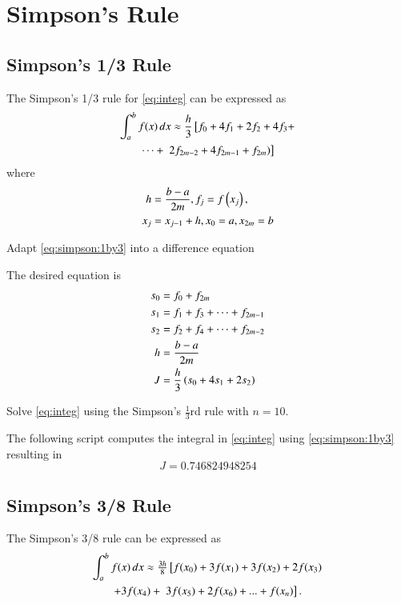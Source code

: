 \documentclass[journal,12pt,twocolumn]{IEEEtran}
\begin{document}
\section{Simpson's Rule}
\subsection{Simpson's 1/3 Rule}
The Simpson's 1/3 rule for \eqref{eq:integ} can be expressed as \cite{kreyszig}
%
\begin{multline}
\label{eq:simpson:1by3}
\int_{a}^{b}f(x)\,dx \approx \frac{h}{3} {}\left[f_0+4f_1+2f_2 + 4f_3 +\right.
\\
\dots + {}\left.2f_{2m-2}+4f_{2m-1}+f_{2m})\right]
\end{multline}
%
where 
%
\begin{align}
h &= \frac{b-a}{2m}, f_j = f\left(x_j\right),
\\
x_j &= x_{j-1} + h, x_0 = a, x_{2m} = b
\end{align}
%

\begin{problem}
Adapt \eqref{eq:simpson:1by3} into a difference equation
\end{problem}
\solution The desired equation is
%
\begin{align}
\label{eq:simpson_1_3_diff}
s_0 &= f_0 + f_{2m}
\\
s_1 &= f_1 + f_3 + \dots + f_{2m-1}
\\
s_2 &= f_2 + f_4 + \dots + f_{2m-2}
\\
h &= \frac{b-a}{2m}	
\\
J &= \frac{h}{3} \left(s_0 + 4s_1 + 2s_2\right)
\end{align}
%
\begin{problem}
Solve \eqref{eq:integ}
using the Simpson's $\frac{1}{3}$rd rule with $n =10$.
\end{problem}
\solution The following script computes the integral in \eqref{eq:integ} using \eqref{eq:simpson:1by3} resulting in
\begin{equation}
J = 0.746824948254
\end{equation}

\subsection{Simpson's 3/8 Rule}
The Simpson's 3/8 rule can be expressed as \cite{simpson3by8}
\begin{multline}
\label{eq:simpson:3by8}
\int _{a}^{b}f(x)\,dx\approx {\tfrac {3h}{8}}{}\left[f(x_{0})+3f(x_{1})+3f(x_{2})
+2f(x_{3})\right.
\\
+3f(x_{4})
+{}\left.3f(x_{5})+2f(x_{6})+...+f(x_{n})\right].
\end{multline}
%
\end{document}
